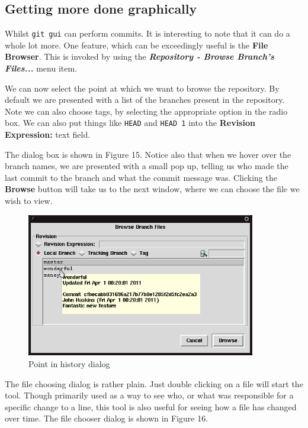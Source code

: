 \subsection{Getting more done graphically}
Whilst \texttt{git gui} can perform commits.  It is interesting to note that it can do a whole lot more.  One feature, which can be exceedingly useful is the \textbf{File Browser}.  This is invoked by using the \textbf{\emph{Repository - Browse Branch's Files...}} menu item.

We can now select the point at which we want to browse the repository.  By default we are presented with a list of the branches present in the repository.  Note we can also choose tags, by selecting the appropriate option in the radio box.  We can also put things like \texttt{HEAD} and \texttt{HEAD~1} into the \textbf{Revision Expression:} text field.  

The dialog box is shown in Figure 15.  Notice also that when we hover over the branch names, we are presented with a small pop up, telling us who made the last commit to the branch and what the commit message was.  Clicking the \textbf{Browse} button will take us to the next window, where we can choose the file we wish to view.

\begin{figure}[hbt]
\centering
\includegraphics[width=10cm]{images/f-w5-d15.png}
\caption{Point in history dialog}
\end{figure} 

The file choosing dialog is rather plain.  Just double clicking on a file will start the  tool.  Though primarily used as a way to see who, or what was responsible for a specific change to a line, this tool is also useful for seeing how a file has changed over time.  The file chooser dialog is shown in Figure 16.

